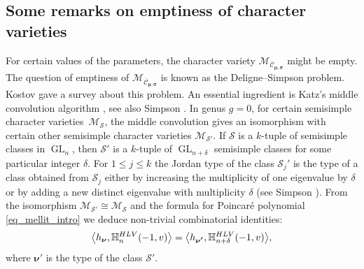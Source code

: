 \documentclass[11pt]{article}
\newcommand{\HLV}{\textup{HLV}}
\newcommand{\blangle}{\bigl\langle}
\newcommand{\brangle}{\bigr\rangle}
\theoremstyle{definition}
\theoremstyle{plain}
\DeclareMathOperator{\GL}{GL}
\newcommand{\mcmus}{\mathcal{M}_{\overline{\mathcal{C}}_{\boldsymbol{\mu},\boldsymbol{\sigma}}}}
\begin{document}
\subsection{Some remarks on emptiness of character varieties}\label{subsect_emptiness}
For certain values of the parameters, the character variety $\mcmus$ might be empty. The question of emptiness of $\mcmus$ is known as the Deligne--Simpson problem. Kostov \cite{Kostov04} gave a survey about this problem. An essential ingredient is Katz's middle convolution algorithm \cite{Katz96}, see also Simpson \cite{Simpson_middle_convolution}. In genus $g=0$, for certain semisimple character varieties~$\mathcal{M}_{\boldsymbol{\mathcal{S}}}$, the middle convolution gives an isomorphism with certain other semisimple character varieties $\mathcal{M}_{\boldsymbol{\mathcal{S}'}}$. If $\boldsymbol{\mathcal{S}}$ is a $k$-tuple of semisimple classes in $\GL_n$, then $\boldsymbol{\mathcal{S}'}$ is a $k$-tuple of $\GL_{n+\delta}$ semisimple classes for some particular integer $\delta$. For $1\le j \le k$ the Jordan type of the class $\mathcal{S}_j'$ is the type of a class obtained from $\mathcal{S}_j$ either by increasing the multiplicity of one eigenvalue by $\delta$ or by adding a new distinct eigenvalue with multiplicity $\delta$ (see Simpson \cite[\S 4]{Simpson_middle_convolution}). From the isomorphism $\mathcal{M}_{\boldsymbol{\mathcal{S}'}}\cong \mathcal{M}_{\boldsymbol{\mathcal{S}}}$ and the formula for Poincaré polynomial \eqref{eq_mellit_intro} we deduce non-trivial combinatorial identities:\enlargethispage{\baselineskip}%
\[
\blangle h_{\boldsymbol{\nu}},\mathbb{H}_n^{\HLV}(-1,v)\brangle =\blangle h_{\boldsymbol{\nu'}},\mathbb{H}_{n+\delta}^{\HLV}(-1,v)\brangle,
\]
where $\boldsymbol{\nu}'$ is the type of the class $\boldsymbol{\mathcal{S}'}$.
\end{document}
